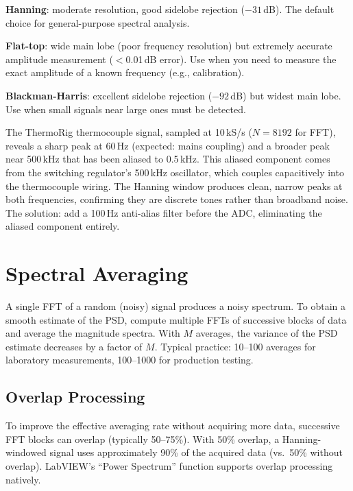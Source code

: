 \documentclass[11pt,letterpaper,twoside,openany]{book}
\begin{document}
\textbf{Hanning}: moderate resolution, good sidelobe rejection ($-31$\,dB). The default choice for general-purpose spectral analysis.

\textbf{Flat-top}: wide main lobe (poor frequency resolution) but extremely accurate amplitude measurement ($<$0.01\,dB error). Use when you need to measure the exact amplitude of a known frequency (e.g., calibration).

\textbf{Blackman-Harris}: excellent sidelobe rejection ($-92$\,dB) but widest main lobe. Use when small signals near large ones must be detected.

\begin{examplebox}
The ThermoRig thermocouple signal, sampled at 10\,kS/s ($N = 8192$ for FFT), reveals a sharp peak at 60\,Hz (expected: mains coupling) and a broader peak near 500\,kHz that has been aliased to 0.5\,kHz. This aliased component comes from the switching regulator's 500\,kHz oscillator, which couples capacitively into the thermocouple wiring. The Hanning window produces clean, narrow peaks at both frequencies, confirming they are discrete tones rather than broadband noise. The solution: add a 100\,Hz anti-alias filter before the ADC, eliminating the aliased component entirely.
\end{examplebox}

\section{Spectral Averaging}
A single FFT of a random (noisy) signal produces a noisy spectrum. To obtain a smooth estimate of the PSD, compute multiple FFTs of successive blocks of data and average the magnitude spectra. With $M$ averages, the variance of the PSD estimate decreases by a factor of $M$. Typical practice: 10--100 averages for laboratory measurements, 100--1000 for production testing.

\subsection{Overlap Processing}
To improve the effective averaging rate without acquiring more data, successive FFT blocks can overlap (typically 50--75\%). With 50\% overlap, a Hanning-windowed signal uses approximately 90\% of the acquired data (vs.\ 50\% without overlap). LabVIEW's ``Power Spectrum'' function supports overlap processing natively.
\end{document}
